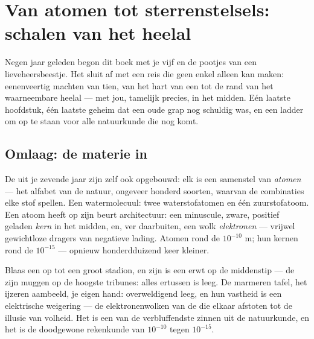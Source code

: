 \chapter{Van atomen tot sterrenstelsels: schalen van het heelal}\label{ch:g9:atoms-to-galaxies}

Negen jaar geleden begon dit boek met je vijf  en de pootjes
van een lieveheersbeestje. Het sluit af met een reis die geen enkel
 alleen kan maken: eenenveertig machten van tien, van het hart
van een  tot de rand van het waarneembare heelal --- met jou,
tamelijk precies, in het midden. Eén laatste hoofdstuk, één laatste
geheim dat een oude grap nog schuldig was, en een ladder om op te staan
voor alle natuurkunde die nog komt.

\section{Omlaag: de materie in}

\begin{definition}[Atomen]\label{def:g9:atoms-to-galaxies:atom}
De  uit je zevende jaar zijn zelf ook opgebouwd: elk
 is een samenstel van \emph{atomen} --- het
alfabet van de natuur, ongeveer honderd soorten, waarvan de combinaties
elke stof spellen. Een watermolecuul: twee waterstofatomen en
één zuurstofatoom. Een atoom heeft op zijn beurt architectuur: een
minuscule, zware, positief geladen \emph{kern} in het
midden, en, ver daarbuiten, een wolk \emph{elektronen}
--- vrijwel gewichtloze dragers van negatieve lading. Atomen  rond
de $10^{-10}$ \unit{m}; hun kernen rond de $10^{-15}$ --- opnieuw
honderdduizend keer kleiner.
\end{definition}

\begin{proposition}\label{prop:g9:atoms-to-galaxies:empty}
Blaas een  op tot een groot stadion, en zijn
 is een erwt op de middenstip --- de
 zijn muggen op de hoogste tribunes: alles ertussen
is leeg. De marmeren tafel, het ijzeren aambeeld, je eigen hand:
overweldigend leeg, en hun vastheid is een elektrische weigering --- de
elektronenwolken van de  die elkaar afstoten
tot de illusie van volheid. Het is een van de verbluffendste zinnen uit
de natuurkunde, en het is de doodgewone rekenkunde van $10^{-10}$ tegen
$10^{-15}$.
\end{proposition}

